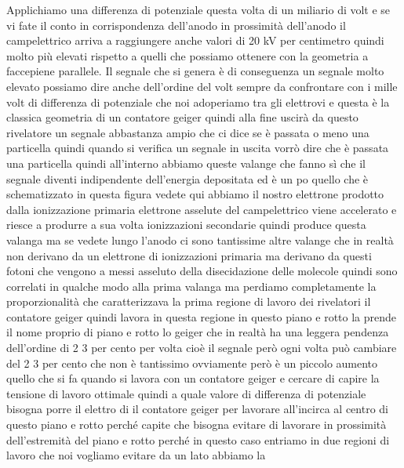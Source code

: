 Applichiamo una differenza di potenziale questa volta di un miliario di volt e se vi fate il conto in corrispondenza dell'anodo in prossimità dell'anodo il campelettrico arriva a raggiungere anche valori di 20 kV per centimetro quindi molto più elevati rispetto a quelli che possiamo ottenere con la geometria a faccepiene parallele. Il segnale che si genera è di conseguenza un segnale molto elevato possiamo dire anche dell'ordine del volt sempre da confrontare con i mille volt di differenza di potenziale che noi adoperiamo tra gli elettrovi e questa è la classica geometria di un contatore geiger quindi alla fine uscirà da questo rivelatore un segnale abbastanza ampio che ci dice se è passata o meno una particella quindi quando si verifica un segnale in uscita vorrò dire che è passata una particella quindi all'interno abbiamo queste valange che fanno sì che il segnale diventi indipendente dell'energia depositata ed è un po quello che è schematizzato in questa figura vedete qui abbiamo il nostro elettrone prodotto dalla ionizzazione primaria elettrone asselute del campelettrico viene accelerato e riesce a produrre a sua volta ionizzazioni secondarie quindi produce questa valanga ma se vedete lungo l'anodo ci sono tantissime altre valange che in realtà non derivano da un elettrone di ionizzazioni primaria ma derivano da questi fotoni che vengono a messi asseluto della disecidazione delle molecole quindi sono correlati in qualche modo alla prima valanga ma perdiamo completamente la proporzionalità che caratterizzava la prima regione di lavoro dei rivelatori il contatore geiger quindi lavora in questa regione in questo piano e rotto la prende il nome proprio di piano e rotto lo geiger che in realtà ha una leggera pendenza dell'ordine di 2 3 per cento per volta cioè il segnale però ogni volta può cambiare del 2 3 per cento che non è tantissimo ovviamente però è un piccolo aumento quello che si fa quando si lavora con un contatore geiger e cercare di capire la tensione di lavoro ottimale quindi a quale valore di differenza di potenziale bisogna porre il elettro di il contatore geiger per lavorare all'incirca al centro di questo piano e rotto perché capite che bisogna evitare di lavorare in prossimità dell'estremità del piano e rotto perché in questo caso entriamo in due regioni di lavoro che noi vogliamo evitare da un lato abbiamo la 

